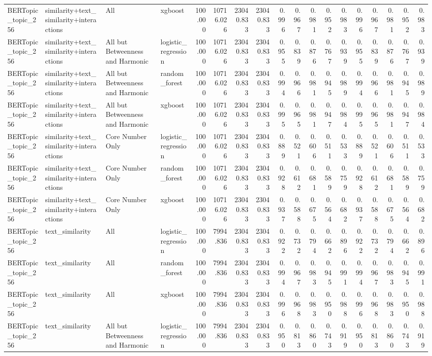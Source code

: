 \begin{tabular}{llllrrrrrrrrrrrrrr}
BERTopic_topic_256 & similarity+text_similarity+interactions & All & xgboost & 100.000 & 10716.026 & 23040.833 & 23040.833 & 0.996 & 0.967 & 0.981 & 0.952 & 0.983 & 0.996 & 0.967 & 0.981 & 0.952 & 0.983 \\
BERTopic_topic_256 & similarity+text_similarity+interactions & All but Betweenness and Harmonic & logistic_regression & 100.000 & 10716.026 & 23040.833 & 23040.833 & 0.955 & 0.839 & 0.876 & 0.767 & 0.939 & 0.955 & 0.839 & 0.876 & 0.767 & 0.939 \\
BERTopic_topic_256 & similarity+text_similarity+interactions & All but Betweenness and Harmonic & random_forest & 100.000 & 10716.026 & 23040.833 & 23040.833 & 0.994 & 0.966 & 0.981 & 0.945 & 0.989 & 0.994 & 0.966 & 0.981 & 0.945 & 0.989 \\
BERTopic_topic_256 & similarity+text_similarity+interactions & All but Betweenness and Harmonic & xgboost & 100.000 & 10716.026 & 23040.833 & 23040.833 & 0.995 & 0.965 & 0.981 & 0.947 & 0.984 & 0.995 & 0.965 & 0.981 & 0.947 & 0.984 \\
BERTopic_topic_256 & similarity+text_similarity+interactions & Core Number Only & logistic_regression & 100.000 & 10716.026 & 23040.833 & 23040.833 & 0.889 & 0.521 & 0.606 & 0.511 & 0.533 & 0.889 & 0.521 & 0.606 & 0.511 & 0.533 \\
BERTopic_topic_256 & similarity+text_similarity+interactions & Core Number Only & random_forest & 100.000 & 10716.026 & 23040.833 & 23040.833 & 0.928 & 0.612 & 0.681 & 0.589 & 0.759 & 0.928 & 0.612 & 0.681 & 0.589 & 0.759 \\
BERTopic_topic_256 & similarity+text_similarity+interactions & Core Number Only & xgboost & 100.000 & 10716.026 & 23040.833 & 23040.833 & 0.937 & 0.588 & 0.675 & 0.564 & 0.682 & 0.937 & 0.588 & 0.675 & 0.564 & 0.682 \\
BERTopic_topic_256 & text_similarity & All & logistic_regression & 100.000 & 7994.836 & 23040.833 & 23040.833 & 0.922 & 0.732 & 0.794 & 0.662 & 0.896 & 0.922 & 0.732 & 0.794 & 0.662 & 0.896 \\
BERTopic_topic_256 & text_similarity & All & random_forest & 100.000 & 7994.836 & 23040.833 & 23040.833 & 0.994 & 0.967 & 0.983 & 0.945 & 0.991 & 0.994 & 0.967 & 0.983 & 0.945 & 0.991 \\
BERTopic_topic_256 & text_similarity & All & xgboost & 100.000 & 7994.836 & 23040.833 & 23040.833 & 0.996 & 0.968 & 0.983 & 0.950 & 0.988 & 0.996 & 0.968 & 0.983 & 0.950 & 0.988 \\
BERTopic_topic_256 & text_similarity & All but Betweenness and Harmonic & logistic_regression & 100.000 & 7994.836 & 23040.833 & 23040.833 & 0.950 & 0.813 & 0.860 & 0.743 & 0.919 & 0.950 & 0.813 & 0.860 & 0.743 & 0.919 \\

\end{tabular}

